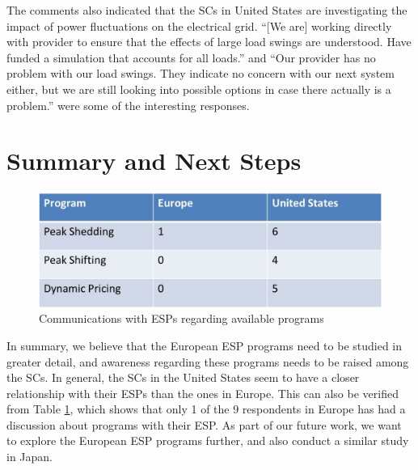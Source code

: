 \documentclass{article}
\begin{document}
The comments also indicated that the SCs in United States are investigating the impact of power fluctuations on the electrical grid. ``[We are] working directly with provider to ensure that the effects of large load swings are understood. Have funded a simulation that accounts for all loads.'' and ``Our provider has no problem with our load swings. They indicate no concern with our next system either, but we are still looking into possible options in case there actually is a problem.'' were some of the interesting responses.

\section{Summary and Next Steps}
\label{summary}

\begin{figure}
\begin{center}
\includegraphics[scale=0.5]{figs/Table3.jpg}
\caption{Communications with ESPs regarding available programs}
\label{fig:table3}
\end{center}
\end{figure}

In summary, we believe that the European ESP programs need to be studied in greater detail, and awareness regarding these programs needs to be raised among the SCs. In general, the SCs in the United States seem to have a closer relationship with their ESPs than the ones in Europe. This can also be verified from Table \ref{fig:table3}, which shows that only 1 of the 9 respondents in Europe has had a discussion about programs with their ESP. As part of our future work, we want to explore the European ESP programs further, and also conduct a similar study in Japan.



\end{document}
